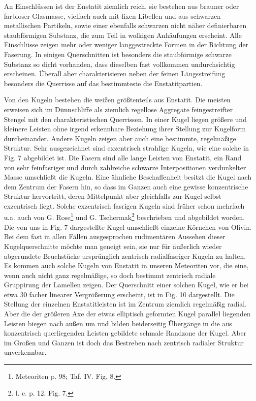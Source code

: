 \documentclass[a4paper, 11pt, oneside]{article}
\begin{document}
An Einschlüssen ist der Enstatit ziemlich reich, sie bestehen aus brauner oder farbloser Glasmasse, vielfach auch mit fixen Libellen und aus schwarzen metallischen Partikeln, sowie einer ebenfalls schwarzen nicht näher definierbaren staubförmigen Substanz, die zum Teil in wolkigen Anhäufungen erscheint. Alle Einschlüsse zeigen mehr oder weniger langgestreckte Formen in der Richtung der Faserung. In einigen Querschnitten ist besonders die staubförmige schwarze Substanz so dicht vorhanden, dass dieselben fast vollkommen undurchsichtig erscheinen. Überall aber charakterisieren neben der feinen Längsstreifung besonders die Querrisse auf das bestimmteste die Enstatitpartien.

Von den Kugeln bestehen die weißen größtenteils aus Enstatit. Die meisten erweisen sich im Dünnschliffe als ziemlich regellose Aggregate feingestreifter Stengel mit den charakteristischen Querrissen. In einer Kugel liegen größere und kleinere Leisten ohne irgend erkennbare Beziehung ihrer Stellung zur Kugelform durcheinander. Andere Kugeln zeigen aber auch eine bestimmte, regelmäßige Struktur. Sehr ausgezeichnet sind exzentrisch strahlige Kugeln, wie eine solche in Fig. 7 abgebildet ist. Die Fasern sind alle lange Leisten von Enstatit, ein Rand von sehr feinfasriger und durch zahlreiche schwarze Interpositionen verdunkelter Masse umschließt die Kugeln. Eine ähnliche Beschaffenheit besitzt die Kugel nach dem Zentrum der Fasern hin, so dass im Ganzen auch eine gewisse konzentrische Struktur hervortritt, deren Mittelpunkt aber gleichfalls zur Kugel selbst exzentrisch liegt. Solche exzentrisch fasrigen Kugeln sind früher schon mehrfach u.a. auch von G. Rose\footnote{Meteoriten p. 98; Taf. IV. Fig. 8.} und G. Tschermak\footnote{l. c. p. 12. Fig. 7.} beschrieben und abgebildet worden. Die von uns in Fig. 7 dargestellte Kugel umschließt einzelne Körnchen von Olivin. Bei dem fast in allen Fällen ausgesprochen rudimentären Aussehen dieser Kugelquerschnitte möchte man geneigt sein, sie nur für äußerlich wieder abgerundete Bruchstücke ursprünglich zentrisch radialfasriger Kugeln zu halten. Es kommen auch solche Kugeln von Enstatit in unseren Meteoriten vor, die eine, wenn auch nicht ganz regelmäßige, so doch bestimmt zentrisch radiale Gruppirung der Lamellen zeigen. Der Querschnitt einer solchen Kugel, wie er bei etwa 30 facher linearer Vergrößerung erscheint, ist in Fig. 10 dargestellt. Die Stellung der einzelnen Enstatitleisten ist im Zentrum ziemlich regelmäßig radial. Aber die der größeren Axe der etwas elliptisch geformten Kugel parallel liegenden Leisten biegen nach außen um und bilden beiderseitig Übergänge in die aus konzentrisch querliegenden Leisten gebildete schmale Randzone der Kugel. Aber im Großen und Ganzen ist doch das Bestreben nach zentrisch radialer Struktur unverkennbar.
\end{document}
